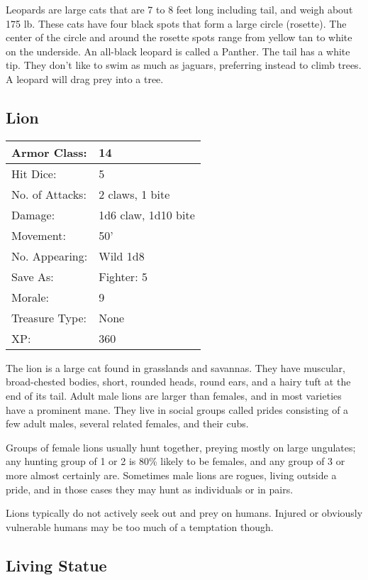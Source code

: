 \documentclass[a4paper,twoside,openany,10pt]{book}
\begin{document}
\begin{multicols}{2}
Leopards are large cats that are 7 to 8 feet long including tail, and weigh about 175 lb. These cats have four black spots that form a large circle (rosette). The center of the circle and around the rosette spots range from yellow tan to white on the underside. An all-black leopard is called a Panther. The tail has a white tip. They don't like to swim as much as jaguars, preferring instead to climb trees. A leopard will drag prey into a tree.

\subsection*{Lion}\label{lion}

\begin{tabularx}{0.50\textwidth}{@{}lX@{}}
Armor Class: & 14 \\\hline
Hit Dice: & 5 \\\hline
No. of Attacks: & 2 claws, 1 bite \\\hline
Damage: & 1d6 claw, 1d10 bite \\\hline
Movement: & 50' \\\hline
No. Appearing: & Wild 1d8 \\\hline
Save As: & Fighter: 5 \\\hline
Morale: & 9 \\\hline
Treasure Type: & None \\\hline
XP: & 360 \\\hline
\end{tabularx}\medskip

The lion is a large cat found in grasslands and savannas. They have muscular, broad-chested bodies, short, rounded heads, round ears, and a hairy tuft at the end of its tail. Adult male lions are larger than females, and in most varieties have a prominent mane. They live in social groups called prides consisting of a few adult males, several related females, and their cubs.

Groups of female lions usually hunt together, preying mostly on large ungulates; any hunting group of 1 or 2 is 80\% likely to be females, and any group of 3 or more almost certainly are. Sometimes male lions are rogues, living outside a pride, and in those cases they may hunt as individuals or in pairs.

Lions typically do not actively seek out and prey on humans. Injured or obviously vulnerable humans may be too much of a temptation though.

\subsection*{Living Statue}\label{living-statue}


\end{multicols}
\end{document}
